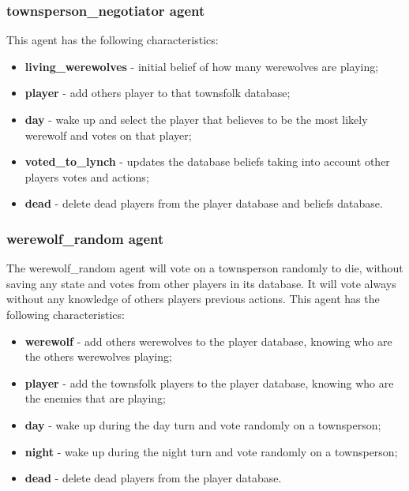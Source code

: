 \documentclass{article}
\begin{document}
\subsubsection{townsperson\_negotiator agent}
This agent has the following characteristics:
\begin{itemize}
	\item \textbf{living\_werewolves} - initial belief of how many werewolves are playing; 
	\item \textbf{player} - add others player to that townsfolk database;
	\item \textbf{day} - wake up and select the player that believes to be the most likely werewolf and votes on that player;
	\item \textbf{voted\_to\_lynch} - updates the database beliefs taking into account other players votes and actions;
	\item \textbf{dead} - delete dead players from the player database and beliefs database.
\end{itemize}

\subsubsection{werewolf\_random agent}
The werewolf\_random agent will vote on a townsperson randomly to die, without saving any state and votes from other players in its database. It will vote always without any knowledge of others players previous actions.
This agent has the following characteristics:
\begin{itemize}
	\item \textbf{werewolf} - add others werewolves to the player database, knowing who are the others werewolves playing;
	\item \textbf{player} - add the townsfolk players to the player database, knowing who are the enemies that are playing;
	\item \textbf{day} - wake up during the day turn and vote randomly on a townsperson;
	\item \textbf{night} - wake up during the night turn and vote randomly on a townsperson;
	\item \textbf{dead} - delete dead players from the player database.
\end{itemize}
\end{document}
